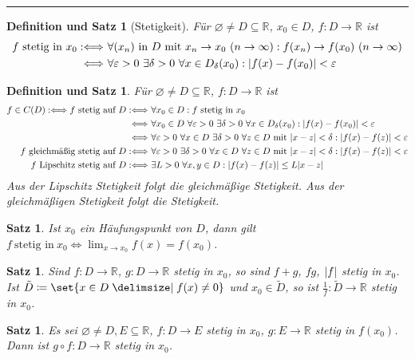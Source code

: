\documentclass[a4paper]{article}
\newcounter{Sec}
\theoremstyle{marginbreak}
\newtheorem{satz}[definition]{Satz}
\newtheorem{defsatz}[definition]{Definition und Satz}
\newcommand{\sep}{%
	\rule{\textwidth}{0.3pt}%
	\stepcounter{Sec}%
	}
\newcommand{\defiff}{:\Longleftrightarrow}
\newcommand{\en}{~(n\to\infty)}
\begin{document}
	\sep
	\begin{defsatz}[Stetigkeit]
		Für $\varnothing\neq D\subseteq\mathbb{R}$, $x_0\in D$, $f\colon D\to\mathbb{R}$
		ist
		\begin{align*}
			f~\text{stetig in}~x_0
			\defiff&~\forall(x_n)~\text{in}~D~\text{mit}~x_n\to x_0\en:f(x_n)\to f(x_0)\en\\
			\Longleftrightarrow&~\forall\varepsilon>0~\exists\delta>0~\forall x\in D_\delta(x_0):\abs{f(x)-f(x_0)}<\varepsilon
		\end{align*}
	\end{defsatz}
	\begin{defsatz}
		Für $\varnothing\neq D\subseteq\mathbb{R}$, $f\colon D\to\mathbb{R}$
		ist
		\begin{align*}
			f\in C(D)\defiff
			f~\text{stetig auf $D$}
			\defiff&~\forall x_0\in D:f~\text{stetig in $x_0$}\\
			\Longleftrightarrow&~\forall x_0\in D~\forall\varepsilon>0~\exists\delta>0~\forall x\in D_\delta(x_0):\abs{f(x)-f(x_0)}<\varepsilon\\
			\Longleftrightarrow&~\forall\varepsilon>0~\forall x\in D~\exists\delta>0~\forall z\in D~\text{mit}~\abs{x-z}<\delta:\abs{f(x)-f(z)}<\varepsilon\\
			f~\text{gleichmäßig stetig auf $D$}
			\defiff&~\forall\varepsilon>0~\exists\delta>0~\forall x\in D~\forall z\in D~\text{mit}~\abs{x-z}<\delta:\abs{f(x)-f(z)}<\varepsilon\\
			f~\text{Lipschitz stetig auf $D$}
			\defiff&~\exists L>0~\forall x,y\in D:\abs{f(x)-f(z)}\leq L\abs{x-z}
		\end{align*}
		Aus der Lipschitz Stetigkeit folgt die gleichmäßige Stetigkeit.
		Aus der gleichmäßigen Stetigkeit folgt die Stetigkeit.
	\end{defsatz}
	\begin{satz}
		Ist $x_0$ ein Häufungspunkt von $D$, dann gilt $f~\text{stetig in}~x_0\iff\lim_{x\to x_0}f(x)=f(x_0)$.
	\end{satz}
	\begin{satz}
		Sind $f\colon D\to\mathbb{R}$, $g\colon D\to\mathbb{R}$ stetig in $x_0$, so
		sind $f + g$, $fg$, $\abs{f}$ stetig in $x_0$. Ist $\tilde{D}\coloneqq\set{x\in D\given f(x)\neq0}$
		und $x_0\in\tilde{D}$, so ist $\frac{1}{f}\colon\tilde{D}\to\mathbb{R}$ stetig in
		$x_0$.
	\end{satz}
	\begin{satz}
		Es sei $\varnothing\neq D, E\subseteq\mathbb{R}$, $f\colon D\to E$ stetig in $x_0$,
		$g\colon E\to\mathbb{R}$ stetig in $f(x_0)$. Dann ist $g\circ f\colon D\to\mathbb{R}$
		stetig in $x_0$.
	\end{satz}
\end{document}
